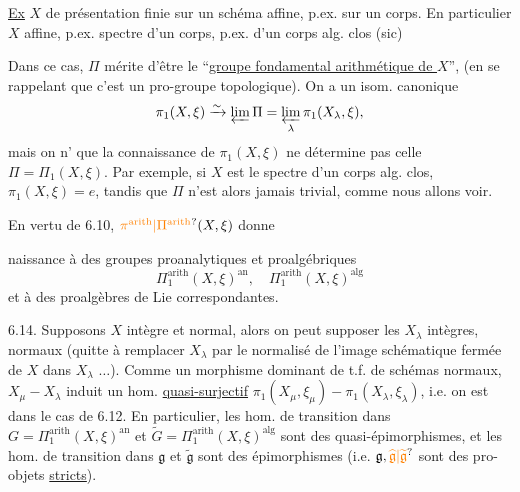 \uline{Ex} $X$ de présentation finie sur un schéma affine, p.ex. sur un
corps. En particulier $X$ affine, p.ex.  spectre d'un
corps, p.ex. d'un corps alg. clos (sic)

Dans ce cas, $\Pi$ mérite d'être  le
``\uline{groupe fondamental arithmétique de $X$}'',
(en se rappelant que c'est un  pro-groupe topologique).
On a un isom. canonique
\[
\pi_1(X,\xi)\xrightarrow{\sim}\varprojlim\Pi
=\varprojlim_\lambda\pi_1(X_\lambda,\xi),
\]
mais on n' que la connaissance de $\pi_1(X,\xi)$ ne
détermine pas celle  
 $\Pi=\Pi_1(X,\xi)$.
Par exemple, si $X$ est le spectre d'un corps alg. clos,
$\pi_1(X,\xi)=e$, tandis que $\Pi$ n'est alors jamais trivial, comme
nous allons voir.

En vertu de 6.10, $\unsure{\pi^{\mathrm{arith}}|\Pi^{\mathrm{arith}}}(X,\xi)$
donne

naissance à des groupes proanalytiques et proalgébriques
\[
\Pi_1^{\mathrm{arith}}(X,\xi)^{\mathrm{an}},\quad
\Pi_1^{\mathrm{arith}}(X,\xi)^{\mathrm{alg}}
\]
et à des proalgèbres de Lie correspondantes.

6.14. Supposons $X$ intègre et normal, alors on peut supposer les
$X_\lambda$ intègres, normaux (quitte à  remplacer $X_\lambda$
par le normalisé de l'image schématique fermée de $X$ dans $X_\lambda$
$\ldots$). 
Comme un  morphisme dominant de t.f. de schémas normaux,
$X_\mu\mathbin{-}X_\lambda$ induit un  hom.
\uline{quasi-surjectif}
$\pi_1(X_\mu,\xi_\mu)\mathbin{-}\pi_1(X_\lambda,\xi_\lambda)$,
i.e. on est dans le cas de 6.12. En particulier, les  hom.
de transition dans \deleted{$\unsure{\Pi}$}
$G=\Pi_1^{\mathrm{arith}}(X,\xi)^{\mathrm{an}}$ et
$\widetilde{G}=\Pi_1^{\mathrm{arith}}(X,\xi)^{\mathrm{alg}}$ sont des
quasi-épimorphismes, et les hom. de transition dans $\mathfrak{g}$ et
$\widetilde{\mathfrak{g}}$ sont des épimorphismes (i.e.
$\mathfrak{g},\unsure{\widehat{\mathfrak{g}}|\widetilde{\mathfrak{g}}}$
sont des pro-objets \uline{stricts}).

